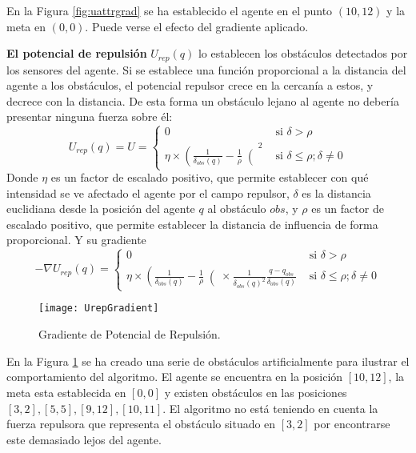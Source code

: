 En la Figura \ref{fig:uattrgrad} se ha establecido el agente en el punto $(10,12)$ y la meta en $(0,0)$. Puede verse el efecto del gradiente aplicado.

\textbf{El potencial de repulsión} $U_{rep}(q)$ lo establecen los obstáculos detectados por los sensores del agente. Si se establece una función proporcional a la distancia del agente a los obstáculos, el potencial repulsor crece en la cercanía a estos, y decrece con la distancia. De esta forma un obstáculo lejano al agente no debería presentar ninguna fuerza sobre él:
\begin{equation}
U_{rep}(q) = U = \begin{cases}
0 & \text{ si } \delta > \rho \\ 
\eta \times \left(\frac{1}{\delta_{obs}(q)}-\frac{1}{\rho}\right(^2 & \text{ si } \delta \leq \rho; \delta \neq 0 
\end{cases}
\label{equation:Urepq}
\end{equation}
Donde $\eta$ es un factor de escalado positivo, que permite establecer con qué intensidad se ve afectado el agente por el campo repulsor, $\delta$ es la distancia euclidiana desde la posición del agente $q$ al obstáculo $obs$, y $\rho$ es un factor de escalado positivo, que permite establecer la distancia de influencia de forma proporcional. Y su gradiente
\begin{equation}
-\nabla U_{rep}(q) = \begin{cases} 0 & \text{ si } \delta > \rho \\
\eta \times \left(\frac{1}{\delta_{obs}(q)}-\frac{1}{\rho}\right( \times \frac{1}{\delta_\mathit{obs}(q)^2}\frac{q-q_\mathit{obs}}{\delta_\mathit{obs}(q)} & \text{ si }  \delta \leq \rho; \delta \neq 0  
\end{cases}
\label{equation:dUrepq}
\end{equation}
\begin{figure}
	\centering
	\texttt{[image: UrepGradient]}
	\caption{Gradiente de Potencial de Repulsión.}\label{fig:urepgrad}
\end{figure}

 En la Figura \ref{fig:urepgrad} se ha creado una serie de obstáculos artificialmente para ilustrar el comportamiento del algoritmo. El agente se encuentra en la posición $[10, 12]$, la meta esta establecida en $[0, 0]$ y existen obstáculos en las posiciones $[3, 2], [5, 5], [9, 12], [10, 11]$. El algoritmo no está teniendo en cuenta la fuerza repulsora que representa el obstáculo situado en $[3, 2]$ por encontrarse este demasiado lejos del agente.

